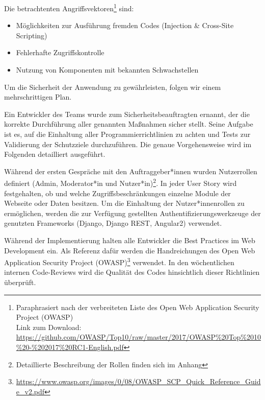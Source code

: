 \documentclass[accentcolor=tud0b,12pt,paper=a4]{tudreport}
\begin{document}
Die betrachtenten Angriffsvektoren\footnote{Paraphrasiert nach der verbreiteten Liste des Open Web Application Security Project (OWASP)\\Link zum Download:  \href{https://github.com/OWASP/Top10/raw/master/2017/OWASP\%20Top\%2010\%20-\%202017\%20RC1-English.pdf}{https://github.com/OWASP/Top10/raw/master/2017/OWASP\%20Top\%2010\%20-\%202017\%20RC1-English.pdf}} sind:
\begin{itemize}
\item Möglichkeiten zur Ausführung fremden Codes (Injection \& Cross-Site Scripting)
\item Fehlerhafte Zugriffskontrolle
\item Nutzung von Komponenten mit bekannten Schwachstellen
\end{itemize}

Um die Sicherheit der Anwendung zu gewährleisten, folgen wir einem mehrschrittigen Plan.

Ein Entwickler des Teams wurde zum Sicherheitsbeauftragten ernannt, der die korrekte Durchführung aller genannten Maßnahmen sicher stellt. Seine Aufgabe ist es, auf die Einhaltung aller Programmierrichtlinien zu achten und Tests zur Validierung der Schutzziele durchzuführen. Die genaue Vorgehensweise wird im Folgenden detailliert ausgeführt.

Während der ersten Gespräche mit den Auftraggeber*innen wurden Nutzerrollen definiert (Admin, Moderator*in und Nutzer*in)\footnote{Detaillierte Beschreibung der Rollen finden sich im Anhang}. In jeder User Story wird festgehalten, ob und welche Zugriffsbeschränkungen einzelne Module der Webseite oder Daten besitzen. Um die Einhaltung der Nutzer*innenrollen zu ermöglichen, werden die zur Verfügung gestellten Authentifizierungswerkzeuge der genutzten Frameworks (Django, Django REST, Angular2) verwendet.

Während der Implementierung halten alle Entwickler die Best Practices im Web Development ein. Als Referenz dafür werden die Handreichungen des Open Web Application Security Project (OWASP)\footnote{\href{https://www.owasp.org/images/0/08/OWASP_SCP_Quick_Reference_Guide_v2.pdf}{https://www.owasp.org/images/0/08/OWASP\_SCP\_Quick\_Reference\_Guide\_v2.pdf}} verwendet. In den wöchentlichen internen Code-Reviews wird die Qualität des Codes hinsichtlich dieser Richtlinien überprüft.
\end{document}
